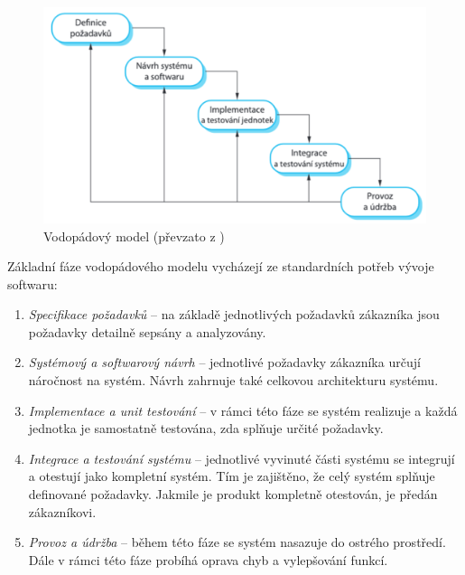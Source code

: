 \documentclass[czech,master]{diploma}
\begin{document}
\begin{figure}[!ht]
    \centering
    \includegraphics[width=1\textwidth]{Diplomka/Figures/waterfall.png}
    \caption{Vodopádový model (převzato z \cite{ref:sommerrville_waterfall})}
    \label{fig:waterfall}
\end{figure}

Základní fáze vodopádového modelu vycházejí ze standardních potřeb vývoje softwaru:

\begin{enumerate}
\item \textit{Specifikace požadavků} -- na základě jednotlivých požadavků zákazníka jsou požadavky detailně sepsány a analyzovány.

\item \textit{Systémový a softwarový návrh} -- jednotlivé požadavky zákazníka určují náročnost na systém. Návrh zahrnuje také celkovou architekturu systému.

\item \textit{Implementace a unit testování} -- v rámci této fáze se systém realizuje a každá jednotka je samostatně testována, zda splňuje určité požadavky.

\item \textit{Integrace a testování systému} -- jednotlivé vyvinuté části systému se integrují a otestují jako kompletní systém. Tím je zajištěno, že celý systém splňuje definované požadavky. Jakmile je produkt kompletně otestován, je předán zákazníkovi.

\item \textit{Provoz a údržba} -- během této fáze se systém nasazuje do ostrého prostředí. Dále v rámci této fáze probíhá oprava chyb a vylepšování funkcí.

\end{enumerate}
\end{document}
